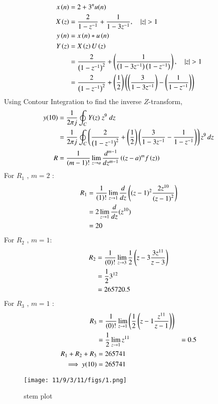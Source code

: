 \documentclass[journal,12pt,twocolumn]{IEEEtran}
\theoremstyle{remark}
\begin{document}
\begin{align}
x\left(n\right) &= {2+3^{n}}u(n)\\
X\left(z\right) &= \frac{2}{{1-z^{-1}}}+\frac{1}{1-3z^{-1}} , \quad|z| > 1\\
y\left(n\right) &= x\left(n\right)*u\left(n\right) \\
Y\left(z\right) &= X\left(z\right)U\left(z\right)\\
&=\frac{2}{\left(1-z^{-1}\right)^{2}}+\left(\frac{1}{\left(1-3z^{-1}\right)\left(1-z^{-1}\right)}\right) ,\quad|z| >{1}\\
&=\frac{2}{\left(1-z^{-1}\right)^{2}}+\left(\frac{1}{2}\right)\left(\left(\frac{3}{1-3z^{-1}}\right)-\left(\frac{1}{1-z^{-1}}\right)\right)
\end{align}
 Using Contour Integration to find the inverse $Z$-transform,
\begin{align}
y(10)&=\frac{1}{2\pi j}\oint_{C}Y(z) \;z^{9} \;dz  \\
&=\frac{1}{2\pi j}\oint_{C}\left(\frac{2}{\left(1-z^{-1}\right)^{2}}+\left(\frac{1}{2}\right)\left(\frac{3}{1-3z^{-1}}-\frac{1}{1-z^{-1}}\right)\right){z^{9}}\,dz\\
R &=\frac{1}{\left(m-1\right)!}\lim\limits_{z\to a}\frac{d^{m-1}}{dz^{m-1}}\left({(z-a)^{m}}f\left(z\right)\right)
\end{align}
For $R_1$ , $m=2$ :
\begin{align}
R_1 &=\frac{1}{\left(1\right)!}\lim\limits_{z\to 1}\frac{d}{dz}\left({\left(z-1\right)^{2}}\frac{2z^{10}}{{\left(z-1\right)^2}}\right)  \\
&=2\lim\limits_{z\to 1}\frac{d}{dz}(z^{10})   \\
&=20
\end{align}
For $R_2$ , $m=1$:
\begin{align}
R_2 &=\frac{1}{\left(0\right)!}\lim\limits_{z\to 3}\frac{1}{2}\left({z-3}\frac{3z^{11}}{{{z-3}}}\right) \\
&=\frac{1}{2}{3^{12}}  \\
&=265720.5
\end{align}
For $R_3$ , $m=1$ :
\begin{align}
R_3 &=\frac{1}{\left(0\right)!}\lim\limits_{z\to 1}\left(\frac{1}{2}\left({z-1}\frac{z^{11}}{{{z-1}}}\right)\right)  \\
&=\frac{1}{2}\lim\limits_{z\to1}z^{11}
&=0.5\\
 R_1 + R_2 + R_3 &= 265741\\
    \implies  y{(10)} &= 265741
\end{align}
\begin{figure}[b]
    \centering
    \texttt{[image: 11/9/3/11/figs/1.png]}
    \caption{stem plot }
    \label{fig:1}
\end{figure}
\end{document}
